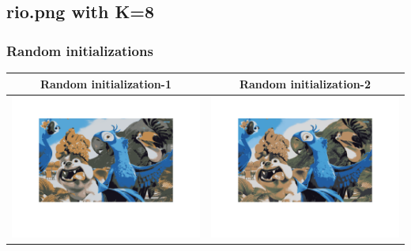 \documentclass[fleqn]{article}
\begin{document}
\subsection{rio.png with K=8}
\subsubsection{Random initializations}
\begin{center}
  \begin{longtable}{ c | c }
	\multicolumn{1}{c}{Random initialization-1} & 
	\multicolumn{1}{c}{Random initialization-2}  \\
    \hline
    \includegraphics[scale=0.4]{./pics/task1and2/EM_K=8_rio_random1.png}  & \includegraphics[scale=0.4]{./pics/task1and2/EM_K=8_rio_random2.png} \\
    \hline
  \end{longtable}
\end{center}
\end{document}
